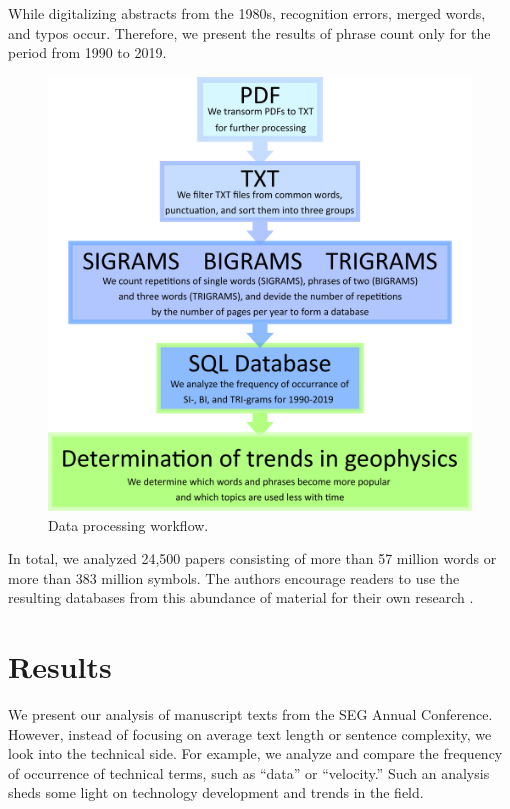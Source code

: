 \documentclass[geosciences,article,submit,moreauthors,pdftex]{Definitions/mdpi}
\begin{document}
While digitalizing abstracts from the 1980s, recognition errors, merged words, and typos occur. Therefore, we present the results of phrase count only for the period from 1990 to 2019.

\begin{figure}[ht!]
\centering
\includegraphics[scale=1]{scheme.png}
\caption{Data processing workflow.}
\label{scheme_workflow}
\end{figure}


In total, we analyzed 24,500 papers consisting of more than 57 million words or more than 383 million symbols. The authors encourage readers to use the resulting databases from this abundance of material for their own research \citep{Eltsov2020}.

 
\section{Results}

We present our analysis of manuscript texts from the SEG Annual Conference. However, instead of focusing on average text length or sentence complexity, we look into the technical side. For example, we analyze and compare the frequency of occurrence of technical terms, such as ``data'' or ``velocity.'' Such an analysis sheds some light on technology development and trends in the field.
\end{document}
